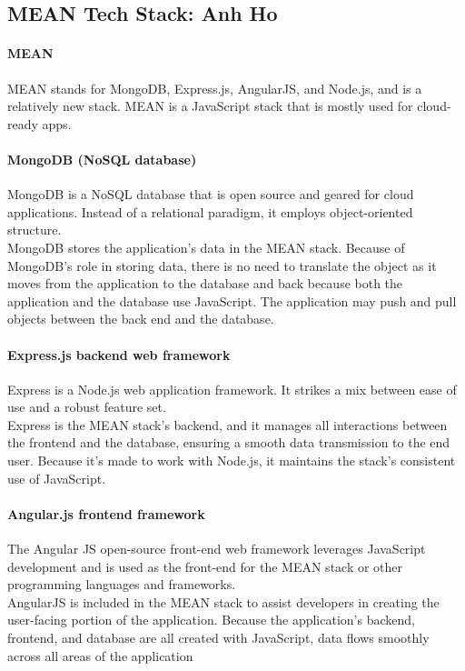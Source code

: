 \documentclass[a4paper, 11pt]{report}
\begin{document}
	\subsection{MEAN Tech Stack: Anh Ho}
	\paragraph{MEAN} MEAN stands for MongoDB, Express.js, AngularJS, and Node.js, and is a relatively new stack. MEAN is a JavaScript stack that is mostly used for cloud-ready apps.
	
	\paragraph{MongoDB (NoSQL database)} MongoDB is a NoSQL database that is open source and geared for cloud applications. Instead of a relational paradigm, it employs object-oriented structure.
	\\ MongoDB stores the application's data in the MEAN stack. Because of MongoDB’s role in storing data, there is no need to translate the object as it moves from the application to the database and back because both the application and the database use JavaScript. The application may push and pull objects between the back end and the database.
	
	\paragraph{Express.js backend web framework} Express is a Node.js web application framework. It strikes a mix between ease of use and a robust feature set.
	\\ Express is the MEAN stack's backend, and it manages all interactions between the frontend and the database, ensuring a smooth data transmission to the end user. Because it's made to work with Node.js, it maintains the stack's consistent use of JavaScript.
	
	\paragraph {Angular.js frontend framework} The Angular JS open-source front-end web framework leverages JavaScript development and is used as the front-end for the MEAN stack or other programming languages and frameworks. 
	\\AngularJS is included in the MEAN stack to assist developers in creating the user-facing portion of the application. Because the application's backend, frontend, and database are all created with JavaScript, data flows smoothly across all areas of the application
	
\end{document}

